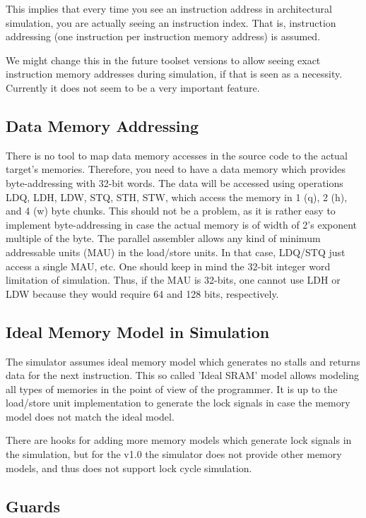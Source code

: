 \documentclass[twoside]{tceusermanual}
\begin{document}
This implies that every time you see an instruction address in
architectural simulation, you are actually seeing an instruction index.
That is, instruction addressing (one instruction per instruction memory
address) is assumed.

We might change this in the future toolset versions to allow seeing exact
instruction memory addresses during simulation, if that is seen as a
necessity. Currently it does not seem to be a very important feature.

\subsection{Data Memory Addressing}

There is no tool to map data memory accesses in the source code to the
actual target's memories. Therefore, you need to have a data memory which
provides byte-addressing with 32-bit words. The data will be accessed using
operations LDQ, LDH, LDW, STQ, STH, STW, which access the memory in 1 (q),
2 (h), and 4 (w) byte chunks. This should not be a problem, as it is rather
easy to implement byte-addressing in case the actual memory is of width of
2's exponent multiple of the byte. The parallel assembler allows any kind
of minimum addressable units (MAU) in the load/store units. In that case,
LDQ/STQ just access a single MAU, etc. One should keep in mind the 32-bit
integer word limitation of simulation. Thus, if the MAU is 32-bits, one
cannot use LDH or LDW because they would require 64 and 128 bits,
respectively.

\subsection{Ideal Memory Model in Simulation}

The simulator assumes ideal memory model which generates no stalls and
returns data for the next instruction. This so called 'Ideal SRAM' model
allows modeling all types of memories in the point of view of the
programmer. It is up to the load/store unit implementation to generate the
lock signals in case the memory model does not match the ideal model.

There are hooks for adding more memory models which generate lock signals
in the simulation, but for the v1.0 the simulator does not provide other
memory models, and thus does not support lock cycle simulation.

\subsection{Guards}
\end{document}
